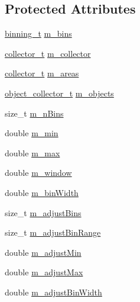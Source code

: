 \subsection*{Protected Attributes}
\begin{DoxyCompactItemize}
\item 
\hyperlink{classSlidingWindow_1_1Window_a71c711c04a16a1f32a9731f80e73b5e8}{binning\+\_\+t} \hyperlink{classSlidingWindow_1_1Window_a3f4acfc8faac69f90803bdbce13828bc}{m\+\_\+bins}
\item 
\hyperlink{classSlidingWindow_1_1Window_a86da88957da29f042341ff4b0413316e}{collector\+\_\+t} \hyperlink{classSlidingWindow_1_1Window_a37032250670011a5a2fdff0a0c406ba3}{m\+\_\+collector}
\item 
\hyperlink{classSlidingWindow_1_1Window_a86da88957da29f042341ff4b0413316e}{collector\+\_\+t} \hyperlink{classSlidingWindow_1_1Window_ac3654a276b9c1e8ca2d03a18ab23336d}{m\+\_\+areas}
\item 
\hyperlink{classSlidingWindow_1_1Window_a3883a474287703a42cf8971ba8ef6884}{object\+\_\+collector\+\_\+t} \hyperlink{classSlidingWindow_1_1Window_a05a54515c6d4c39b28f524d6cb491cec}{m\+\_\+objects}
\item 
size\+\_\+t \hyperlink{classSlidingWindow_1_1Window_a3766b935d338405d7e475770233fcea3}{m\+\_\+n\+Bins}
\item 
double \hyperlink{classSlidingWindow_1_1Window_a76de5f0c8ec2471d87122221bd8704fe}{m\+\_\+min}
\item 
double \hyperlink{classSlidingWindow_1_1Window_a8432b5cb2b2905277fce6156bbea4884}{m\+\_\+max}
\item 
double \hyperlink{classSlidingWindow_1_1Window_a29f03954035661fea490d9442e730f47}{m\+\_\+window}
\item 
double \hyperlink{classSlidingWindow_1_1Window_a290b3c6a5a678ce8651b650758e20401}{m\+\_\+bin\+Width}
\item 
size\+\_\+t \hyperlink{classSlidingWindow_1_1Window_a94679f3f59d0fb1cfe3a0ea3992f7198}{m\+\_\+adjust\+Bins}
\item 
size\+\_\+t \hyperlink{classSlidingWindow_1_1Window_a742d6f030de136c948ef0bd62fd11bb2}{m\+\_\+adjust\+Bin\+Range}
\item 
double \hyperlink{classSlidingWindow_1_1Window_ae0d29d89f73402d85c3bac1cc295d4c4}{m\+\_\+adjust\+Min}
\item 
double \hyperlink{classSlidingWindow_1_1Window_aeb0cb796c71f6fc4029a03ce839fe759}{m\+\_\+adjust\+Max}
\item 
double \hyperlink{classSlidingWindow_1_1Window_aa1ae0483bbbcdb0334d3356f279ef2b7}{m\+\_\+adjust\+Bin\+Width}

\end{DoxyCompactItemize}
